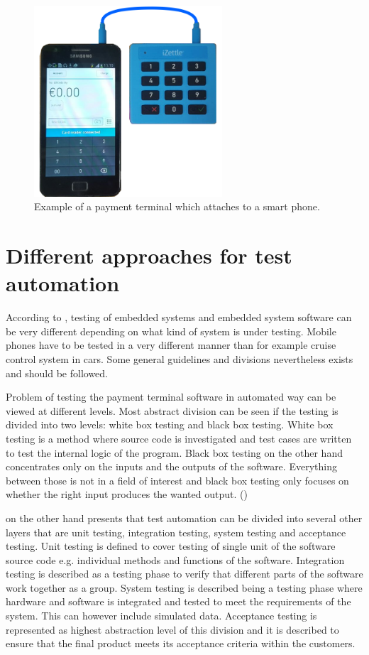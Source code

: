 \begin{figure}[ht]
  \begin{center}
    \includegraphics[width=7cm]{images/izettle.png}
    \caption{Example of a payment terminal which attaches to a smart phone.}
    \label{fig:izettle}
  \end{center}
\end{figure}

\section{Different approaches for test automation}
\label{section:test automation approaches}

According to \emph{\cite{broekman2003testing}}, testing of embedded systems and embedded system software can be very different depending on what kind of system is under testing. Mobile phones have to be tested in a very different manner than for example cruise control system in cars. Some general guidelines and divisions nevertheless exists and should be followed.

Problem of testing the payment terminal software in automated way can be viewed at different levels. Most abstract division can be seen if the testing is divided into two levels: white box testing and black box testing. White box testing is a method where source code is investigated and test cases are written to test the internal logic of the program. Black box testing on the other hand concentrates only on the inputs and the outputs of the software. Everything between those is not in a field of interest and black box testing only focuses on whether the right input produces the wanted output. (\emph{\cite{myers2011art}})

\emph{\cite{huizinga2007automated}} on the other hand presents that test automation can be divided into several other layers that are unit testing, integration testing, system testing and acceptance testing. Unit testing is defined to cover testing of single unit of the software source code e.g. individual methods and functions of the software. Integration testing is described as a testing phase to verify that different parts of the software work together as a group. System testing is described being a testing phase where hardware and software is integrated and tested to meet the requirements of the system. This can however include simulated data. Acceptance testing is represented as highest abstraction level of this division and it is described to ensure that the final product meets its acceptance criteria within the customers.

